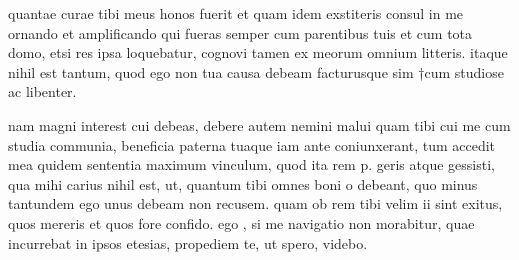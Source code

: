 


 quantae curae tibi meus honos fuerit et quam idem exstiteris consul in me ornando et amplificando qui fueras semper cum parentibus tuis et cum tota domo, etsi res ipsa loquebatur, cognovi tamen ex meorum omnium litteris. itaque nihil est tantum, quod ego non tua causa debeam facturusque sim †cum studiose ac libenter.

 nam magni interest cui debeas, debere autem nemini malui quam tibi cui me cum studia communia, beneficia paterna tuaque iam ante coniunxerant, tum accedit mea quidem sententia maximum vinculum, quod ita rem p. geris atque gessisti, qua mihi carius nihil est, ut, quantum tibi omnes boni o debeant, quo minus tantundem ego unus debeam non recusem. quam ob rem tibi velim ii sint exitus, quos mereris et quos fore confido. ego , si me navigatio non morabitur, quae incurrebat in ipsos etesias, propediem te, ut spero, videbo.
